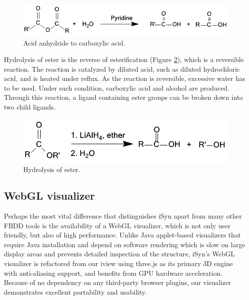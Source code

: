 \begin{figure}
\begin{center}
\includegraphics[width=\linewidth]{../isyn/AcidAnhydrideReaction.png}
\end{center}
\caption{Acid anhydride to carboxylic acid.}
\label{isyn:AcidAnhydrideReaction}
\end{figure}

Hydrolysis of ester is the reverse of esterification (Figure \ref{isyn:EsterHydrolysis}), which is a reversible reaction. The reaction is catalyzed by diluted acid, such as diluted hydrochloric acid, and is heated under reflux. As the reaction is reversible, excessive water has to be used. Under such condition, carboxylic acid and alcohol are produced. Through this reaction, a ligand containing ester groups can be broken down into two child ligands.

\begin{figure}
\begin{center}
\includegraphics[width=\linewidth]{../isyn/EsterHydrolysis.png}
\end{center}
\caption{Hydrolysis of ester.}
\label{isyn:EsterHydrolysis}
\end{figure}

\subsection{WebGL visualizer}

Perhaps the most vital difference that distinguishes iSyn apart from many other FBDD tools is the availability of a WebGL visualizer, which is not only user friendly, but also of high performance. Unlike Java applet-based visualizers that require Java installation and depend on software rendering which is slow on large display areas and prevents detailed inspection of the structure, iSyn's WebGL visualizer is refactored from our iview \citep{1366} using three.js as its primary 3D engine with anti-aliasing support, and benefits from GPU hardware acceleration. Because of no dependency on any third-party browser plugins, our visualizer demonstrates excellent portability and usability.

